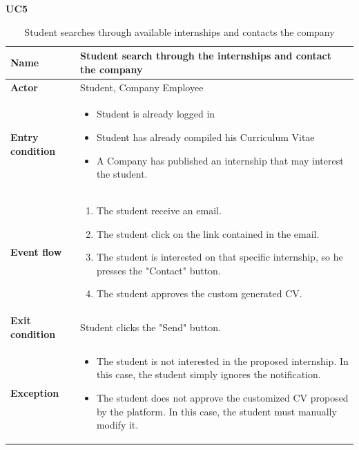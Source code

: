     \textbf{UC5}
    \nopagebreak
    \begin{table}[H]
    \centering
    \begin{tabular}{|l|p{11.9cm}|}
        \hline
        \textbf{Name}            & Student search through the internships and contact the company \\\hline
        \textbf{Actor}           & Student, Company Employee         \\\hline
        \textbf{Entry condition} &
        \begin{itemize}
              \item Student is already logged in
              \item Student has already compiled his Curriculum Vitae
              \item A Company has published an internship that may interest the student.
        \end{itemize}                                        \\\hline
        \textbf{Event flow}      &
        \begin{enumerate}[label=\arabic*.]
              \item The student receive an email.
              \item The student click on the link contained in the email.
              \item The student is interested on that specific internship, so he presses the "Contact" button.
              \item The student approves the custom generated CV.
        \end{enumerate}            \\\hline
        \textbf{Exit condition}  & Student clicks the "Send" button.\\\hline
        \textbf{Exception}       &  
        \begin{itemize}
            \item The student is not interested in the proposed internship. In this case, the student simply ignores the notification.
            \item The student does not approve the customized CV proposed by the platform. In this case, the student must manually modify it.
        \end{itemize} 
        \\\hline
    \end{tabular}
    \caption{Student searches through available internships and contacts the company}
    \label{table:Student search through the internhisps and contact the company}
    \end{table}
